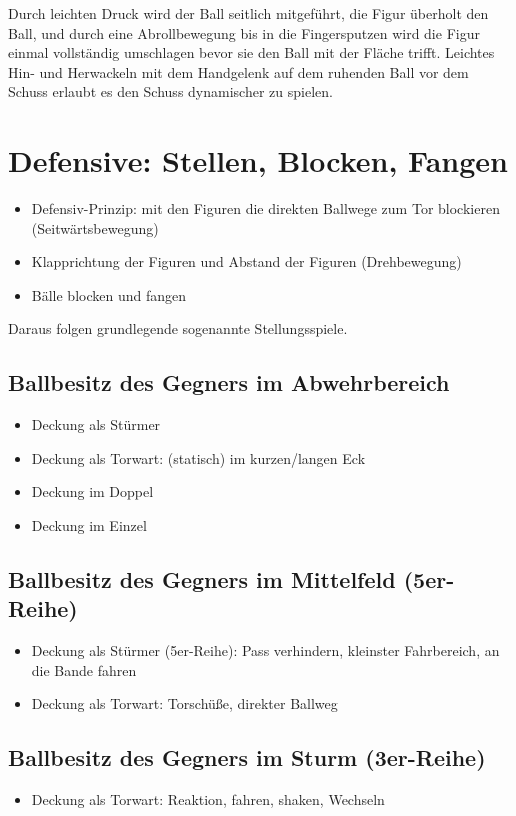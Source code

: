Durch leichten Druck wird der Ball seitlich mitgeführt, die Figur überholt den Ball, und durch eine Abrollbewegung bis in die Fingersputzen wird die Figur einmal vollständig umschlagen bevor sie den Ball mit der Fläche trifft.
Leichtes Hin- und Herwackeln mit dem Handgelenk auf dem ruhenden Ball vor dem Schuss erlaubt es den Schuss dynamischer zu spielen.


\section{Defensive: Stellen, Blocken, Fangen}
\label{technik:defensive}



\begin{itemize}
\item Defensiv-Prinzip: mit den Figuren die direkten Ballwege zum Tor blockieren (Seitwärtsbewegung)  
\item Klapprichtung der Figuren und Abstand der Figuren (Drehbewegung)
\item Bälle blocken und fangen
\end{itemize}
Daraus folgen grundlegende sogenannte Stellungsspiele.


\subsection{Ballbesitz des Gegners im Abwehrbereich}
\label{technik:defensive:gegnerabwehr}

\begin{itemize}
\item Deckung als Stürmer
\item Deckung als Torwart: (statisch) im kurzen/langen Eck
\item Deckung im Doppel
\item Deckung im Einzel
\end{itemize}


\subsection{Ballbesitz des Gegners im Mittelfeld (5er-Reihe)}
\label{technik:defensive:gegnermittelfeld}

\begin{itemize}
\item Deckung als Stürmer (5er-Reihe): Pass verhindern, kleinster Fahrbereich, an die Bande fahren
\item Deckung als Torwart: Torschüße, direkter Ballweg
\end{itemize}


\subsection{Ballbesitz des Gegners im Sturm (3er-Reihe)}
\label{technik:defensive:gegnersturm}

\begin{itemize}
\item Deckung als Torwart: Reaktion, fahren, shaken, Wechseln
\end{itemize}

